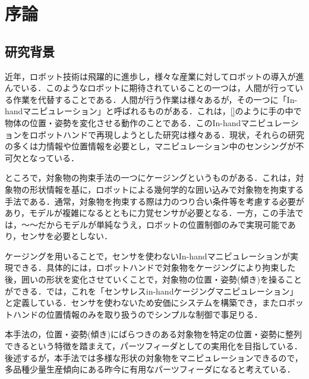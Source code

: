 \documentclass[a4paper,twoside,12pt,papersize, dvipdfmx]{iirthesis}
\begin{document}
    \newcommand{\figref}[1]{\figurename\ref{#1}}
    \newcommand{\tabref}[1]{\tablename\ref{#1}}
    \renewcommand{\eqref}[1]{式~(\ref{#1})}
    \newcommand{\chapref}[1]{\ref{#1}章}
    \newcommand{\secref}[1]{\ref{#1}節}
    \newcommand{\ssecref}[1]{\ref{#1}項}
    \newcommand{\appref}[1]{付録\ref{#1}}
\fi


\chapter{序論}\label{chap::intro}
\minitoc

\section{研究背景}\label{sec::intro::background}
近年，ロボット技術は飛躍的に進歩し，様々な産業に対してロボットの導入が進んでいる．このようなロボットに期待されていることの一つは，人間が行っている作業を代替することである．人間が行う作業は様々あるが，その一つに「In-handマニピュレーション」と呼ばれるものがある．これは，\figref{}のように手の中で物体の位置・姿勢を変化させる動作のことである．このIn-handマニピュレーションをロボットハンドで再現しようとした研究は様々ある．現状，それらの研究の多くは力情報や位置情報を必要とし，マニピュレーション中のセンシングが不可欠となっている．\par

ところで，対象物の拘束手法の一つにケージング\cite{rimon1999}というものがある．これは，対象物の形状情報を基に，ロボットによる幾何学的な囲い込みで対象物を拘束する手法である．通常，対象物を拘束する際は力のつり合い条件等を考慮する必要があり，モデルが複雑になるとともに力覚センサが必要となる．一方，この手法では，～～だからモデルが単純なうえ，ロボットの位置制御のみで実現可能であり，センサを必要としない．\par

ケージングを用いることで，センサを使わないIn-handマニピュレーションが実現できる．具体的には，ロボットハンドで対象物をケージングにより拘束した後，囲いの形状を変化させていくことで，対象物の位置・姿勢(傾き)を操ることができる．\cite{komiyama2020}では，これを「センサレスin-handケージングマニピュレーション」と定義している．センサを使わないため安価にシステムを構築でき，またロボットハンドの位置情報のみを取り扱うのでシンプルな制御で事足りる．\par

本手法の，位置・姿勢(傾き)にばらつきのある対象物を特定の位置・姿勢に整列できるという特徴を踏まえて，パーツフィーダとしての実用化を目指している．後述するが，本手法では多様な形状の対象物をマニピュレーションできるので，多品種少量生産傾向にある昨今に有用なパーツフィーダになると考えている．
\end{document}
